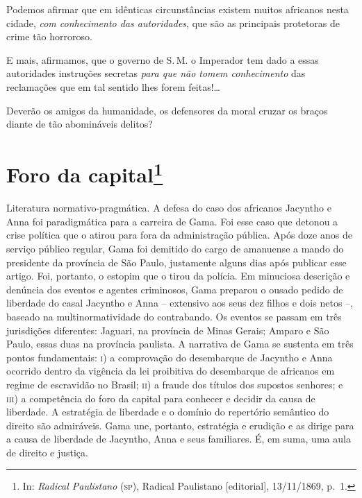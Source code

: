 Podemos afirmar que em idênticas circunstâncias existem muitos africanos
nesta cidade, \emph{com conhecimento das autoridades}, que são as
principais protetoras de crime tão horroroso.

E mais, afirmamos, que o governo de S.\,M. o Imperador tem dado a essas
autoridades instruções secretas \emph{para que não tomem conhecimento}
das reclamações que em tal sentido lhes forem feitas!\ldots

Deverão os amigos da humanidade, os defensores da moral cruzar os braços
diante de tão abomináveis delitos?

\chapter{Foro da capital\footnote{In:
  \emph{Radical Paulistano} (\textsc{sp}), Radical Paulistano {[}editorial{]},
  13/11/1869, p.~1.}}

\begin{didascalia}
Literatura normativo-pragmática. A defesa do caso dos africanos Jacyntho
e Anna foi paradigmática para a carreira de Gama. Foi esse caso que
detonou a crise política que o atirou para fora da administração
pública. Após doze anos de serviço público regular, Gama foi demitido do
cargo de amanuense a mando do presidente da província de São Paulo,
justamente alguns dias após publicar esse artigo. Foi, portanto, o
estopim que o tirou da polícia. Em minuciosa descrição e denúncia dos
eventos e agentes criminosos, Gama preparou o ousado pedido de liberdade
do casal Jacyntho e Anna -- extensivo aos seus dez filhos e dois netos
--, baseado na multinormatividade do contrabando. Os eventos se passam
em três jurisdições diferentes: Jaguari, na província de Minas Gerais;
Amparo e São Paulo, essas duas na província paulista. A narrativa de
Gama se sustenta em três pontos fundamentais: \textsc{i}) a comprovação do
desembarque de Jacyntho e Anna ocorrido dentro da vigência da lei
proibitiva do desembarque de africanos em regime de escravidão no
Brasil; \textsc{ii}) a fraude dos títulos dos supostos senhores; e \textsc{iii}) a
competência do foro da capital para conhecer e decidir da causa de
liberdade. A estratégia de liberdade e o domínio do repertório semântico
do direito são admiráveis. Gama une, portanto, estratégia e erudição e
as dirige para a causa de liberdade de Jacyntho, Anna e seus familiares.
É, em suma, uma aula de direito e justiça.
\end{didascalia}



